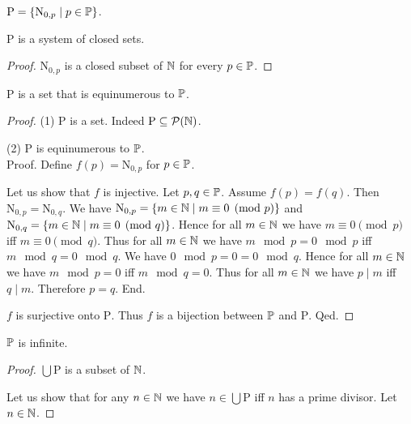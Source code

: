 \documentclass{article}
\newcommand{\N}{\mathrm{N}}
\newcommand{\Ps}{\mathrm{P}}
\begin{document}
  \begin{forthel}
    \begin{definition}
      $\Ps = \{ \N_{0, p} \mid p \in \Prime \}$.
    \end{definition}

    \begin{lemma}
      $\Ps$ is a system of closed sets.
    \end{lemma}
    \begin{proof}
      $\N_{0, p}$ is a closed subset of $\mathbb{N}$ for every $p \in \mathbb{P}$.
    \end{proof}

    \begin{lemma}
      $\Ps$ is a set that is equinumerous to $\mathbb{P}$.
    \end{lemma}
    \begin{proof}
      (1) $\Ps$ is a set.
      Indeed $\Ps \subseteq \pow(\Nat)$.

      (2) $\Ps$ is equinumerous to $\mathbb{P}$. \\
      Proof.
        Define $f(p) = \N_{0,p}$ for $p \in \mathbb{P}$.

        Let us show that $f$ is injective.
          Let $p, q \in \mathbb{P}$.
          Assume $f(p) = f(q)$.
          Then $\N_{0, p} = \N_{0, q}$.
          We have $\N_{0, p} = \{ m \in \Nat \mid m \equiv 0 \pmod{p} \}$ and
          $\N_{0, q} = \{ m \in \Nat \mid m \equiv 0 \pmod{q} \}$.
          Hence for all $m \in \mathbb{N}$ we have $m \equiv 0 \pmod{p}$ iff
          $m \equiv 0 \pmod{q}$.
          Thus for all $m \in \mathbb{N}$ we have $m \mod p = 0 \mod p$ iff
          $m \mod q = 0 \mod q$.
          We have $0 \mod p = 0 = 0 \mod q$.
          Hence for all $m \in \mathbb{N}$ we have $m \mod p = 0$ iff $m \mod q = 0$.
          Thus for all $m \in \mathbb{N}$ we have $p \mid m$ iff $q \mid m$.
          Therefore $p = q$.
        End.

        $f$ is surjective onto $\Ps$.
        Thus $f$ is a bijection between $\mathbb{P}$ and $\Ps$.
      Qed.
    \end{proof}

    \begin{theorem}[Furstenberg]
      $\mathbb{P}$ is infinite.
    \end{theorem}
    \begin{proof}
      $\bigcup \Ps$ is a subset of $\mathbb{N}$.

      Let us show that for any $n \in \mathbb{N}$ we have $n \in \bigcup \Ps$ iff $n$
      has a prime divisor.
        Let $n \in \mathbb{N}$.


\end{proof}
\end{forthel}
\end{document}
